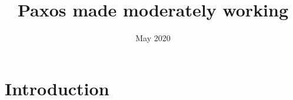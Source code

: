 \documentclass{article}
\title{Paxos made moderately working}
\date{May 2020}
\begin{document}
\maketitle
\tableofcontents
\pagebreak

\section{Introduction}
\end{document}
